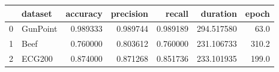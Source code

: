 \begin{tabular}{llrrrrr}
\toprule
{} &   dataset &  accuracy &  precision &    recall &    duration &  epoch \\
\midrule
0 &  GunPoint &  0.989333 &   0.989744 &  0.989189 &  294.517580 &   63.0 \\
1 &      Beef &  0.760000 &   0.803612 &  0.760000 &  231.106733 &  310.2 \\
2 &    ECG200 &  0.874000 &   0.871268 &  0.851736 &  233.101935 &  199.0 \\
\bottomrule
\end{tabular}
